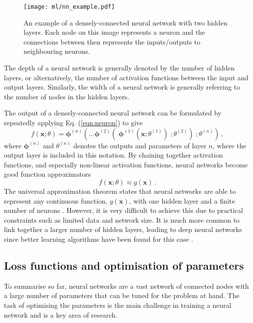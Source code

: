 \documentclass[main.tex]{subfiles}
\begin{document}
    \begin{figure}
        \texttt{[image: ml/nn\_example.pdf]}
        \caption{An example of a densely-connected
        neural network with two hidden layers.
        Each node on this image represents
        a neuron and the connections between then
        represents the inputs/outputs to neighbouring neurons.}
        \label{fig:nn_example}
    \end{figure}

    The depth of a neural network
    is generally denoted by the number of hidden layers,
    or alternatively, the number of activation functions
    between the input and output layers. Similarly,
    the width of a neural network is generally referring
    to the number of nodes in the hidden layers.

    The output of a densely-connected neural network can
    be formulated by repeatedly applying Eq. (\ref{eqn:neuron})
    to give
    \begin{equation}\label{eqn:nn_output}
        f(\mathbf{x}; \theta) = \boldsymbol{\phi}^{(n)}(\ldots \boldsymbol{\phi}^{(2)}(\; \boldsymbol{\phi}^{(1)}(\mathbf{x}; \theta^{(1)})\; ; \theta^{(2)}) \; ; \theta^{(n)}) \, ,
    \end{equation}
    where $\boldsymbol{\phi}^{(n)}$ and $\theta^{(n)}$
    denotes the outputs and parameters of layer $n$,
    where the output layer is included in this notation.
    By chaining together activation functions, and especially
    non-linear activation functions, neural networks
    become good function approximators
    \begin{equation}\label{eqn:nn_approx}
        f(\mathbf{x}; \theta) \approx g(\mathbf{x}) \, .
    \end{equation}
    The universal approximation theorem states that neural networks are
    able to represent any continuous function, $g(\mathbf{x})$,
    with one hidden layer and a finite number of neurons \cite{HORNIK1991251}.
    However, it is very difficult to achieve this due to
    practical constraints such as limited data and network size.
    It is much more common to link
    together a larger number of hidden layers, leading
    to deep neural networks since better learning algorithms
    have been found for this case \cite{lu2017expressive}.
    
\subsection{Loss functions and optimisation of parameters}
    To summarise so far, neural networks are a vast network
    of connected nodes with a large number of parameters that
    can be tuned for the problem at hand.
    The task of optimising the parameters is the main challenge
    in training a neural network and is a key area of research.
\end{document}
